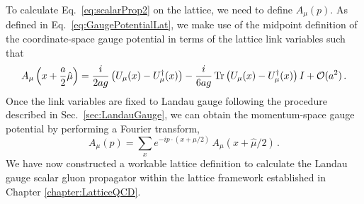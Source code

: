 To calculate Eq.~\eqref{eq:scalarProp2} on the lattice, we need to define $A_\mu(p)$. As defined in Eq.~\eqref{eq:GaugePotentialLat}, we make use of the midpoint definition of the coordinate-space gauge potential in terms of the lattice link variables such that
%
\begin{equation}
A_\mu\left(x+\frac{a}{2}\hat{\mu}\right) = \frac{i}{2ag}\left(U_\mu(x) - U_\mu^\dag(x)\right) - \frac{i}{6ag}\operatorname{Tr}\left(U_\mu(x) - U_\mu^\dag(x)\right)I + \mathcal{O}(a^2)\, .
\end{equation}
%
Once the link variables are fixed to Landau gauge following the procedure described in Sec.~\ref{sec:LandauGauge}, we can obtain the momentum-space gauge potential by performing a Fourier transform,
%
\begin{equation}
A_\mu(p) = \sum_x e^{-ip\cdot(x+\hat{\mu}/2)}\, A_\mu(x+\hat{\mu}/2)\, .
\end{equation}
%
We have now constructed a workable lattice definition to calculate the Landau gauge scalar gluon propagator within the lattice framework established in Chapter \ref{chapter:LatticeQCD}.

